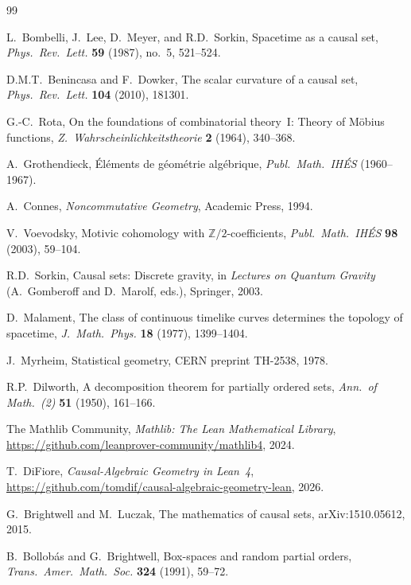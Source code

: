 \documentclass[11pt,a4paper]{article}
\theoremstyle{plain}
\theoremstyle{definition}
\theoremstyle{remark}
\newcommand{\Z}{\mathbb{Z}}
\begin{document}
\begin{thebibliography}{99}

L.~Bombelli, J.~Lee, D.~Meyer, and R.D.~Sorkin,
Spacetime as a causal set,
\emph{Phys.\ Rev.\ Lett.} \textbf{59} (1987), no.~5, 521--524.

D.M.T.~Benincasa and F.~Dowker,
The scalar curvature of a causal set,
\emph{Phys.\ Rev.\ Lett.} \textbf{104} (2010), 181301.

G.-C.~Rota,
On the foundations of combinatorial theory~I: Theory of M\"obius functions,
\emph{Z.\ Wahrscheinlichkeitstheorie} \textbf{2} (1964), 340--368.

A.~Grothendieck,
\'El\'ements de g\'eom\'etrie alg\'ebrique,
\emph{Publ.\ Math.\ IH\'ES} (1960--1967).

A.~Connes,
\emph{Noncommutative Geometry}, Academic Press, 1994.

V.~Voevodsky,
Motivic cohomology with $\Z/2$-coefficients,
\emph{Publ.\ Math.\ IH\'ES} \textbf{98} (2003), 59--104.

R.D.~Sorkin,
Causal sets: Discrete gravity,
in \emph{Lectures on Quantum Gravity} (A.~Gomberoff and D.~Marolf, eds.), Springer, 2003.

D.~Malament,
The class of continuous timelike curves determines the topology of spacetime,
\emph{J.\ Math.\ Phys.} \textbf{18} (1977), 1399--1404.

J.~Myrheim,
Statistical geometry,
CERN preprint TH-2538, 1978.

R.P.~Dilworth,
A decomposition theorem for partially ordered sets,
\emph{Ann.\ of Math.\ (2)} \textbf{51} (1950), 161--166.

The Mathlib Community,
\emph{Mathlib: The Lean Mathematical Library},
\url{https://github.com/leanprover-community/mathlib4}, 2024.

T.~DiFiore,
\emph{Causal-Algebraic Geometry in Lean~4},
\url{https://github.com/tomdif/causal-algebraic-geometry-lean}, 2026.

G.~Brightwell and M.~Luczak,
The mathematics of causal sets,
arXiv:1510.05612, 2015.

B.~Bollob\'as and G.~Brightwell,
Box-spaces and random partial orders,
\emph{Trans.\ Amer.\ Math.\ Soc.} \textbf{324} (1991), 59--72.


\end{thebibliography}
\end{document}
